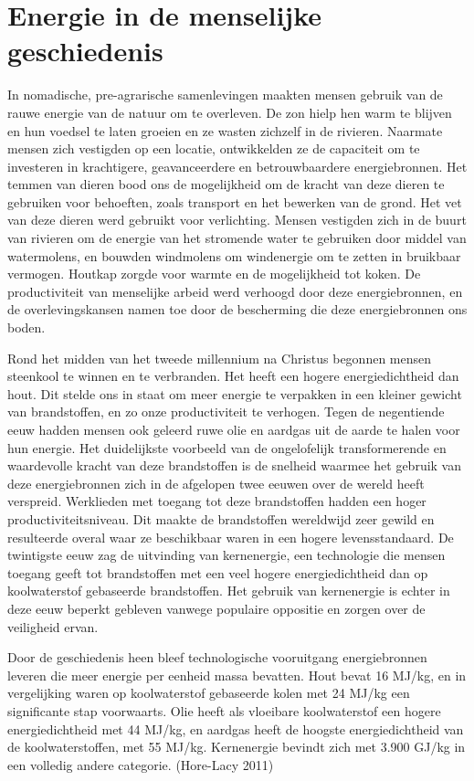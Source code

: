 \documentclass[
  a5paper,
  smalldemyvopaper,11pt,twoside,onecolumn,openright,extrafontsizes,
hidelinks]{memoir}
\begin{document}
\section{Energie in de menselijke
geschiedenis}\label{energie-in-de-menselijke-geschiedenis}

In nomadische, pre-agrarische samenlevingen maakten mensen gebruik van
de rauwe energie van de natuur om te overleven. De zon hielp hen warm te
blijven en hun voedsel te laten groeien en ze wasten zichzelf in de
rivieren. Naarmate mensen zich vestigden op een locatie, ontwikkelden ze
de capaciteit om te investeren in krachtigere, geavanceerdere en
betrouwbaardere energiebronnen. Het temmen van dieren bood ons de
mogelijkheid om de kracht van deze dieren te gebruiken voor behoeften,
zoals transport en het bewerken van de grond. Het vet van deze dieren
werd gebruikt voor verlichting. Mensen vestigden zich in de buurt van
rivieren om de energie van het stromende water te gebruiken door middel
van watermolens, en bouwden windmolens om windenergie om te zetten in
bruikbaar vermogen. Houtkap zorgde voor warmte en de mogelijkheid tot
koken. De productiviteit van menselijke arbeid werd verhoogd door deze
energiebronnen, en de overlevingskansen namen toe door de bescherming
die deze energiebronnen ons boden.

Rond het midden van het tweede millennium na Christus begonnen mensen
steenkool te winnen en te verbranden. Het heeft een hogere
energiedichtheid dan hout. Dit stelde ons in staat om meer energie te
verpakken in een kleiner gewicht van brandstoffen, en zo onze
productiviteit te verhogen. Tegen de negentiende eeuw hadden mensen ook
geleerd ruwe olie en aardgas uit de aarde te halen voor hun energie. Het
duidelijkste voorbeeld van de ongelofelijk transformerende en
waardevolle kracht van deze brandstoffen is de snelheid waarmee het
gebruik van deze energiebronnen zich in de afgelopen twee eeuwen over de
wereld heeft verspreid. Werklieden met toegang tot deze brandstoffen
hadden een hoger productiviteitsniveau. Dit maakte de brandstoffen
wereldwijd zeer gewild en resulteerde overal waar ze beschikbaar waren
in een hogere levensstandaard. De twintigste eeuw zag de uitvinding van
kernenergie, een technologie die mensen toegang geeft tot brandstoffen
met een veel hogere energiedichtheid dan op koolwaterstof gebaseerde
brandstoffen. Het gebruik van kernenergie is echter in deze eeuw beperkt
gebleven vanwege populaire oppositie en zorgen over de veiligheid ervan.

Door de geschiedenis heen bleef technologische vooruitgang
energiebronnen leveren die meer energie per eenheid massa bevatten. Hout
bevat 16 MJ/kg, en in vergelijking waren op koolwaterstof gebaseerde
kolen met 24 MJ/kg een significante stap voorwaarts. Olie heeft als
vloeibare koolwaterstof een hogere energiedichtheid met 44 MJ/kg, en
aardgas heeft de hoogste energiedichtheid van de koolwaterstoffen, met
55 MJ/kg. Kernenergie bevindt zich met 3.900 GJ/kg in een volledig
andere categorie. (Hore-Lacy 2011)
\end{document}
